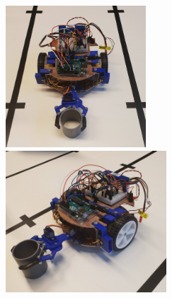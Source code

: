 \documentclass[a4paper,11pt]{article}
\begin{document}
\begin{figure}[H]
    \begin{minipage}[c]{.46\linewidth}
        \centering
        \includegraphics[height = 200]{robot.jpg}
    \end{minipage}
    \hfill
    \begin{minipage}[c]{.46\linewidth}
        \centering
        \includegraphics[height = 200]{robot2.jpg}
    \end{minipage}
\end{figure}
\end{document}

